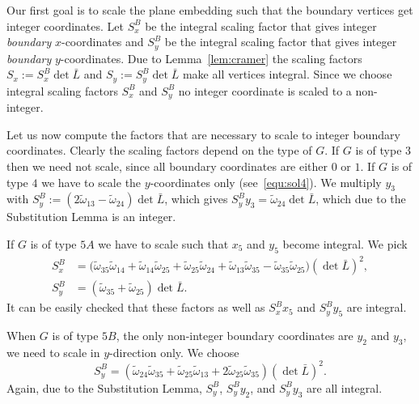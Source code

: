 \documentclass{article}
\theoremstyle{plain} \newtheorem{thm}{Theorem}[section]
\newcommand{\ot}{\tilde{\omega}}
\begin{document}
Our first goal is to scale the plane embedding such that the boundary vertices 
get integer coordinates.  
Let $S^B_x$ be the integral scaling factor that gives integer \textit{boundary} $x$-coordinates
and  $S^B_y$ be the integral scaling factor that gives integer \textit{boundary} $y$-coordinates.
Due to Lemma~\ref{lem:cramer} the scaling factors
$S_x:=S_x^B\det{\bar{L}}$ and $S_y:=S_y^B\det{\bar{L}}$ make all vertices integral.
Since we choose integral scaling factors $S_x^B$ and $S_y^B$ no integer 
coordinate is scaled to a non-integer.

Let us now compute the factors that are necessary to scale to integer 
boundary coordinates.
Clearly the scaling factors depend on the type of $G$. 
If $G$ is of type $3$ then we need not 
scale, since all boundary coordinates are either $0$ or $1$. 
If $G$ is of type $4$ we have to scale the
$y$-coordinates only (see~\ref{equ:sol4}). 
We multiply $y_{3}$ with 
$S_y^B:=(2\ot_{13}-\ot_{24})\det{\bar{L}}$, which gives 
$S_y^B y_{3}= \ot_{24}\det{\bar{L}}$,  which due to the Substitution Lemma is an integer.


If $G$ is of type $5A$ we have to scale such that $x_5$ and $y_5$
 become integral. We pick
\begin{align*}
 S_x^B & = 
 {(\ot_{35}\ot_{14}+\ot_{14}\ot_{25}+\ot_{25}\ot_{24}+\ot_{13}\ot_{35}-\ot_{35}\ot_{25}})
 (\det{\bar{L}})^2,
 \\
 S_y^B & =  (\ot_{35}+\ot_{25})  \det{\bar{L}}. 
 \end{align*}
It can be easily checked that these 
factors as well as  $S^B_x x_5$ and $S^B_y y_5$ are integral.

When $G$ is of type $5B$, the only non-integer boundary coordinates are $y_2$ and $y_3$, we need
to scale in $y$-direction only. We choose
\[S^B_y=(\ot_{24}\ot_{35}+\ot_{25}\ot_{13}+2\ot_{25}\ot_{35}) (\det{\bar{L}})^2.\]
Again, due to the Substitution Lemma, $S^B_y$, $S^B_y y_2$, and $S^B_y y_3$ are all integral.
\end{document}
